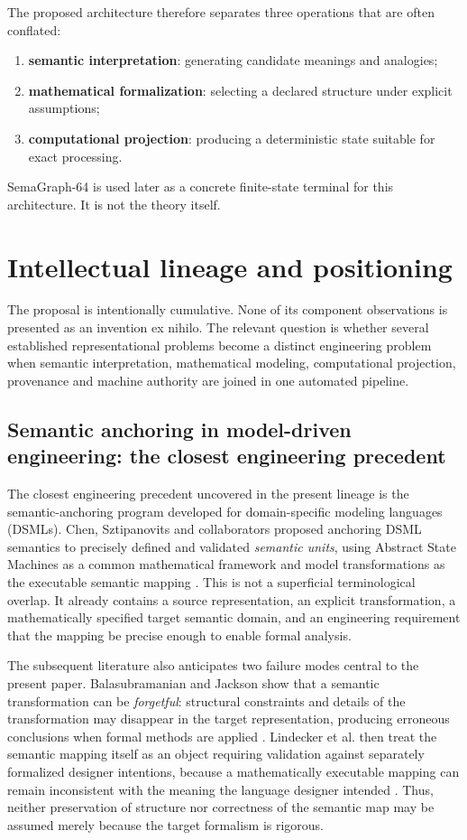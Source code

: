 \documentclass[11pt,a4paper]{article}
\begin{document}
The proposed architecture therefore separates three operations that are often conflated:

\begin{enumerate}
    \item \textbf{semantic interpretation}: generating candidate meanings and analogies;
    \item \textbf{mathematical formalization}: selecting a declared structure under explicit assumptions;
    \item \textbf{computational projection}: producing a deterministic state suitable for exact processing.
\end{enumerate}

SemaGraph-64 is used later as a concrete finite-state terminal for this architecture. It is not the theory itself.


\section{Intellectual lineage and positioning}
The proposal is intentionally cumulative. None of its component observations is presented as an invention ex nihilo. The relevant question is whether several established representational problems become a distinct engineering problem when semantic interpretation, mathematical modeling, computational projection, provenance and machine authority are joined in one automated pipeline.

\subsection{Semantic anchoring in model-driven engineering: the closest engineering precedent}
The closest engineering precedent uncovered in the present lineage is the semantic-anchoring program developed for domain-specific modeling languages (DSMLs). Chen, Sztipanovits and collaborators proposed anchoring DSML semantics to precisely defined and validated \emph{semantic units}, using Abstract State Machines as a common mathematical framework and model transformations as the executable semantic mapping \cite{chen2005infra,chen2005transform}. This is not a superficial terminological overlap. It already contains a source representation, an explicit transformation, a mathematically specified target semantic domain, and an engineering requirement that the mapping be precise enough to enable formal analysis.

The subsequent literature also anticipates two failure modes central to the present paper. Balasubramanian and Jackson show that a semantic transformation can be \emph{forgetful}: structural constraints and details of the transformation may disappear in the target representation, producing erroneous conclusions when formal methods are applied \cite{balasubramanianJackson2009}. Lindecker et al. then treat the semantic mapping itself as an object requiring validation against separately formalized designer intentions, because a mathematically executable mapping can remain inconsistent with the meaning the language designer intended \cite{lindecker2015}. Thus, neither preservation of structure nor correctness of the semantic map may be assumed merely because the target formalism is rigorous.
\end{document}
